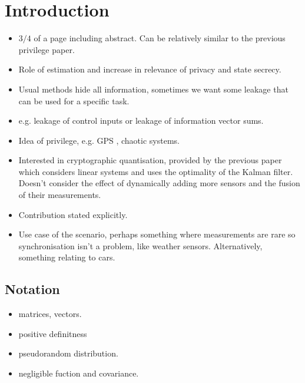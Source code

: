 \documentclass[conference]{IEEEtran}
\begin{document}
\section{Introduction}
\begin{itemize}
  \item $3/4$ of a page including abstract. Can be relatively similar to the previous privilege paper.
  \item Role of estimation and increase in relevance of privacy and state secrecy.
  \item Usual methods hide all information, sometimes we want some leakage that can be used for a specific task.
  \item e.g. leakage of control inputs or leakage of information vector sums.
  \item Idea of privilege, e.g. GPS \cite{grovesPrinciplesGNSSInertial2015}, chaotic systems.
  \item Interested in cryptographic quantisation, provided by the previous paper which considers linear systems and uses the optimality of the Kalman filter. Doesn't consider the effect of dynamically adding more sensors and the fusion of their measurements. 
  \item Contribution stated explicitly.
  \item Use case of the scenario, perhaps something where measurements are rare so synchronisation isn't a problem, like weather sensors. Alternatively, something relating to cars.
\end{itemize}

\subsection{Notation}
\begin{itemize}
  \item matrices, vectors.
  \item positive definitness
  \item pseudorandom distribution.
  \item negligible fuction and covariance.
\end{itemize}
\end{document}
